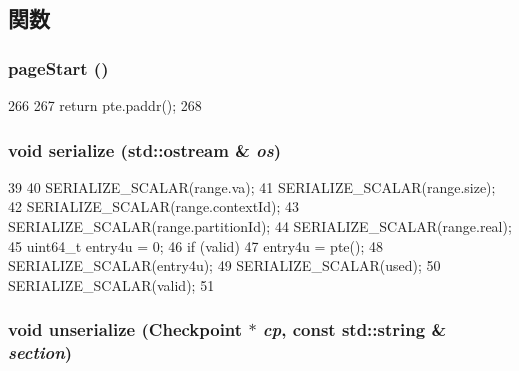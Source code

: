 \subsection{関数}
\hypertarget{structSparcISA_1_1TlbEntry_a4f87fae41ff4bd27577a41dba3cf2b90}{
\subsubsection[{pageStart}]{ pageStart ()}}
\label{structSparcISA_1_1TlbEntry_a4f87fae41ff4bd27577a41dba3cf2b90}



\begin{DoxyCode}
266     {
267         return pte.paddr();
268     }
\end{DoxyCode}
\hypertarget{structSparcISA_1_1TlbEntry_a53e036786d17361be4c7320d39c99b84}{
\subsubsection[{serialize}]{\setlength{\rightskip}{0pt plus 5cm}void serialize (std::ostream \& {\em os})}}
\label{structSparcISA_1_1TlbEntry_a53e036786d17361be4c7320d39c99b84}



\begin{DoxyCode}
39 {
40     SERIALIZE_SCALAR(range.va);
41     SERIALIZE_SCALAR(range.size);
42     SERIALIZE_SCALAR(range.contextId);
43     SERIALIZE_SCALAR(range.partitionId);
44     SERIALIZE_SCALAR(range.real);
45     uint64_t entry4u = 0;
46     if (valid)
47         entry4u = pte();
48     SERIALIZE_SCALAR(entry4u);
49     SERIALIZE_SCALAR(used);
50     SERIALIZE_SCALAR(valid);
51 }
\end{DoxyCode}
\hypertarget{structSparcISA_1_1TlbEntry_af22e5d6d660b97db37003ac61ac4ee49}{
\subsubsection[{unserialize}]{\setlength{\rightskip}{0pt plus 5cm}void unserialize ({\bf Checkpoint} $\ast$ {\em cp}, \/  const std::string \& {\em section})}}
\label{structSparcISA_1_1TlbEntry_af22e5d6d660b97db37003ac61ac4ee49}




